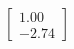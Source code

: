 \documentclass[preview]{standalone}
\begin{document}
\begin{align*}
\begin{bmatrix} 1.00 \\ -2.74 \end{bmatrix}
\end{align*}
\end{document}

